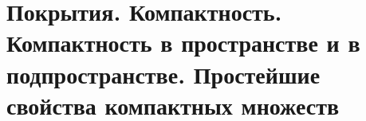 \section{Покрытия. Компактность. Компактность в пространстве и в подпространстве. Простейшие свойства компактных множеств}